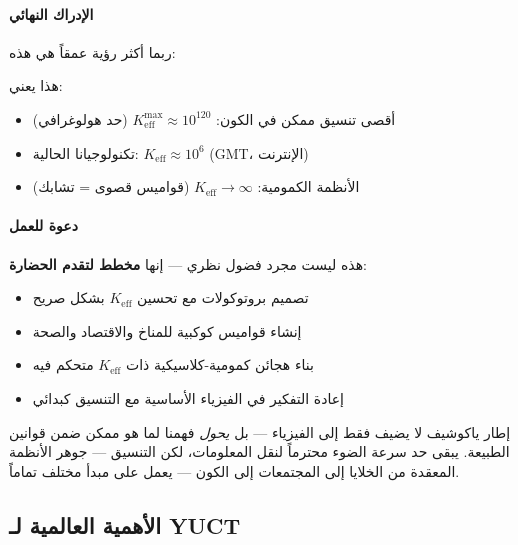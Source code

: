 \documentclass[11pt,a4paper]{article}
\begin{document}
	\paragraph{الإدراك النهائي}
	ربما أكثر رؤية عمقاً هي هذه:
	\begin{center}
	\end{center}
	
	هذا يعني:
	\begin{itemize}
		\item أقصى تنسيق ممكن في الكون: $K_{\mathrm{eff}}^{\max} \approx 10^{120}$ (حد هولوغرافي)
		\item تكنولوجيانا الحالية: $K_{\mathrm{eff}} \approx 10^6$ (GMT، الإنترنت)
		\item الأنظمة الكمومية: $K_{\mathrm{eff}} \to \infty$ (قواميس قصوى = تشابك)
	\end{itemize}
	
	\paragraph{دعوة للعمل}
	هذه ليست مجرد فضول نظري — إنها \textbf{مخطط لتقدم الحضارة}:
	\begin{itemize}
		\item تصميم بروتوكولات مع تحسين $K_{\mathrm{eff}}$ بشكل صريح
		\item إنشاء قواميس كوكبية للمناخ والاقتصاد والصحة
		\item بناء هجائن كمومية-كلاسيكية ذات $K_{\mathrm{eff}}$ متحكم فيه
		\item إعادة التفكير في الفيزياء الأساسية مع التنسيق كبدائي
	\end{itemize}
	
	إطار ياكوشيف لا يضيف فقط إلى الفيزياء — بل \emph{يحول} فهمنا لما هو ممكن ضمن قوانين الطبيعة. يبقى حد سرعة الضوء محترماً لنقل المعلومات، لكن التنسيق — جوهر الأنظمة المعقدة من الخلايا إلى المجتمعات إلى الكون — يعمل على مبدأ مختلف تماماً.
	
	\subsection{الأهمية العالمية لـ YUCT}
	
\end{document}
